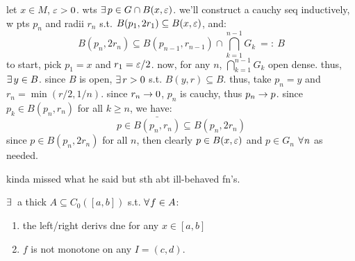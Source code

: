 \begin{pf}[source=Primary Source Material]
	let $x\in M$, $\varepsilon>0$. wts $\ex p\in G\cap B(x,\ep)$.
	we'll construct a cauchy seq inductively, w pts $p_{n}$ and radii $r_{n}$ s.t.
	$B(p_{1},2r_{1})\subseteq B(x,\varepsilon)$, and:
	\begin{equation*}
		B(p_{n},2r_{n})\subseteq B(p_{n-1},r_{n-1})\cap \bigcap_{k=1}^{n-1}G_{k}
		\ =: \ B
	\end{equation*}
	to start, pick $p_{1}=x$ and $r_{1}=\varepsilon/2$.
	now, for any $n$, $\bigcap_{k=1}^{n-1}G_{k}$ open dense. thus, $\ex y \in B$.
	since $B$ is open, $\ex r>0$ s.t. $B(y,r)\subseteq B$.
	thus, take $p_{n}=y$ and $r_{n}=\min(r/2,1/n)$.
	since $r_{n}\rightarrow0$, $p_{n}$ is cauchy, thus $p_{n}\rightarrow p$.
	since $p_{k}\in B(p_{n},r_{n})$ for all $k\geq n$, we have:
	\begin{equation*}
		p\in\bar{B(p_{n},r_{n})}\subseteq B(p_{n},2r_{n})
	\end{equation*}
	since $p\in B(p_{n},2r_{n})$ for all $n$, then clearly $p\in B(x,\varepsilon)$ and $p\in G_{n}$ $\fa n$
	as needed.
\end{pf}
kinda missed what he said but sth abt ill-behaved fn's.

\begin{prop}
	$\ex$ a thick $A\subseteq C_{0}([a,b])$ s.t. $\fa f\in A$:
	\begin{enumerate}
		\item the left/right derivs dne for any $x\in[a,b]$
		\item $f$ is not monotone on any $I=(c,d)$.
	\end{enumerate}
\end{prop} \

